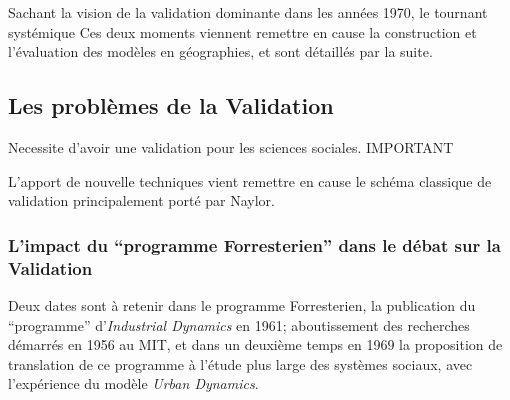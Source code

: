 Sachant la vision de la validation dominante dans les années 1970, le tournant systémique  Ces deux moments viennent remettre en cause la construction et l'évaluation des modèles en géographies, et sont détaillés par la suite.


\subsection{Les problèmes de la Validation}
\label{sec:validation}





Necessite d'avoir une validation pour les sciences sociales.
IMPORTANT

L'apport de nouvelle techniques vient remettre en cause le schéma classique de validation principalement porté par Naylor.

\subsubsection{L'impact du \enquote{programme Forresterien} dans le débat sur la Validation}

Deux dates sont à retenir dans le programme Forresterien, la publication du \enquote{programme} d'\textit{Industrial Dynamics} en 1961; aboutissement des recherches démarrés en 1956 au MIT, et dans un deuxième temps en 1969 la proposition de translation de ce programme à l'étude plus large des systèmes sociaux, avec l'expérience du modèle \textit{Urban Dynamics}.

